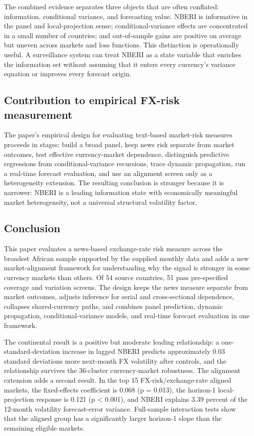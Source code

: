 \documentclass[11pt]{article}
\begin{document}
The combined evidence separates three objects that are often conflated:
information, conditional variance, and forecasting value. NBERI is
informative in the panel and local-projection sense;
conditional-variance effects are concentrated in a small number of
countries; and out-of-sample gains are positive on average but uneven
across markets and loss functions. This distinction is operationally
useful. A surveillance system can treat NBERI as a state variable that
enriches the information set without assuming that it enters every
currency's variance equation or improves every forecast
origin.

\subsection{Contribution to empirical FX-risk
measurement}\label{contribution-to-empirical-fx-risk-measurement}

The paper's empirical design for evaluating text-based market-risk
measures proceeds in stages: build a broad panel, keep news risk
separate from market outcomes, test effective currency-market dependence,
distinguish predictive regressions from conditional-variance
recursions, trace dynamic propagation, run a real-time forecast
evaluation, and use an alignment screen only as a heterogeneity
extension. The resulting conclusion is stronger because it is narrower:
NBERI is a leading information state with economically meaningful market
heterogeneity, not a universal structural volatility
factor.

\subsection{Conclusion}

This paper evaluates a news-based exchange-rate risk measure across the
broadest African sample supported by the supplied monthly data and adds
a new market-alignment framework for understanding why the signal is
stronger in some currency markets than others. Of 54 source countries,
51 pass pre-specified coverage and variation screens. The design keeps
the news measure separate from market outcomes, adjusts inference for
serial and cross-sectional dependence, collapses shared-currency paths,
and combines panel prediction, dynamic propagation, conditional-variance
models, and real-time forecast evaluation in one framework.

The continental result is a positive but moderate leading relationship:
a one-standard-deviation increase in lagged NBERI predicts approximately
0.03 standard deviations more next-month FX volatility after controls,
and the relationship survives the 36-cluster currency-market robustness.
The alignment extension adds a second result. In the top 15
FX-risk/exchange-rate aligned markets, the fixed-effects coefficient is
0.068 (p = 0.013), the horizon-1 local-projection response is 0.121 (p
\textless{} 0.001), and NBERI explains 3.39 percent of the 12-month
volatility forecast-error variance. Full-sample interaction tests show
that the aligned group has a significantly larger horizon-1 slope than
the remaining eligible markets.
\end{document}
